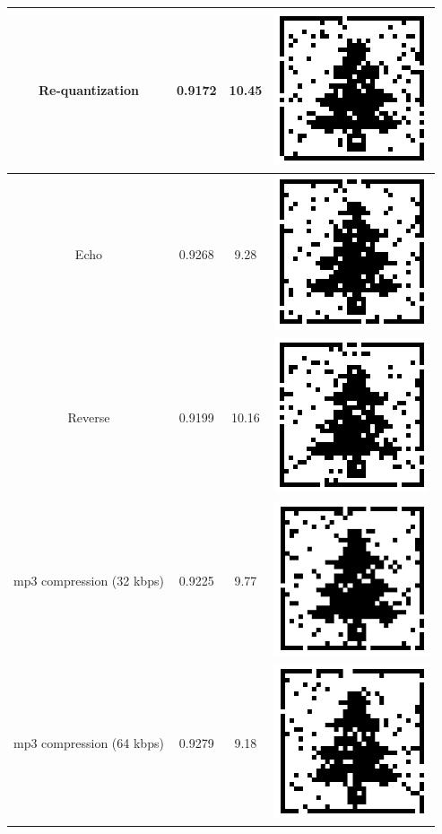 \documentclass[12pt,a4paper]{report}
\begin{document}
\begin{table}[h!]
\begin{tabular} {|c|c|c|c|}
  \hline
 Re-quantization & 0.9172 & 10.45 & \includegraphics[scale=.4]{image/citizen(requantized).png} \\
 \hline 
 Echo & 0.9268 & 9.28 & \includegraphics[scale=.4]{image/citizen(echo).png} \\
  \hline
 Reverse & 0.9199 & 10.16 & \includegraphics[scale=.4]{image/citizen(reverse).png} \\
  \hline
 mp3 compression (32 kbps) & 0.9225 & 9.77 & \includegraphics[scale=.4]{image/citizen(32).png} \\
  \hline
 mp3 compression (64 kbps) & 0.9279 & 9.18 & \includegraphics[scale=.4]{image/citizen(64).png} \\

\end{tabular}
\end{table}
\end{document}
